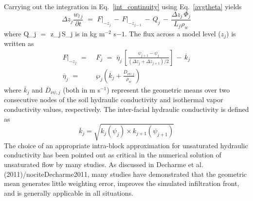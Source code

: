 Carrying out the integration in Eq.~\ref{int_continuity} using 
Eq.~\ref{avgtheta} yields
%
\begin{equation}
\label{avgcont}
\Delta z_j {\frac{w_{l\,j}}{\partial t}} \,\,=\,\,
F\Big\vert_{-z_j} \,-\, 
F\Big\vert_{-z_{j-1}} \,-\, Q_j \,-\,
{\frac{\Delta z_j\, \Phi_j}{L_f\rho_w}} 
\end{equation}
%
%
where 
%
\beq\label{avgsinkQ}
Q_j \,\,=\,\, \Delta z_j\,S_j 
\eeq
%
is in kg m$^{-2}$ s${-1}$.
The flux across a model level ($z_j$) is written as
%
\begin{subequations}
\begin{align}
\label{waterflux}
F\Big\vert_{-z_j} \,\,=&\,\,
F_j \,\,=\,\,
{\overline\eta}_j \,
\left[ \frac{\psi_{j+1}-\psi_{j}}
{\left(\Delta z_j+\Delta z_{j+1} \right)/2}\right] 
\,-\,{\overline k}_j 
\\
\label{waterflux_b}
{\overline\eta}_j \,\,=&\,\, \wp_j \left( {\overline k}_j + 
\frac{{\overline D}_{\nu\psi,j}}{\rho_w} \right)
\end{align}
\end{subequations}
%
where ${\overline k}_j$ and ${\overline D}_{\nu\psi,j}$ 
(both in m s$^{-1}$) represent the geometric means over two
consecutive
nodes of the soil hydraulic conductivity
and isothermal vapor conductivity values, respectively.
The inter-facial hydraulic conductivity is defined as
%
\begin{equation}
\label{kinterp}
{\overline k}_j = \sqrt{k_j\left(\psi_j\right) 
\times k_{j+1}\left(\psi_{j+1}\right)}
\end{equation}
%
The choice of an appropriate intra-block approximation for unsaturated
hydraulic conductivity has been pointed out as critical in the
numerical solution of unsaturated flow by many studies.
As discussed in Decharme et al. (2011)/nocite{Decharme2011},
many studies have demonstrated 
that the geometric mean generates little weighting error, improves the
simulated infiltration front, and is generally applicable in all
situations.

 

